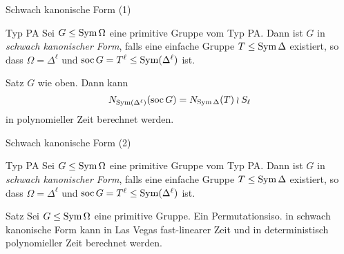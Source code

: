 
\begin{frame}{Schwach kanonische Form (1)}
\begin{block}{Typ PA}
Sei $G \leq \operatorname{Sym} \Omega$ eine primitive Gruppe vom Typ PA.
\pause
Dann ist $G$ in \emph{schwach kanonischer Form}, falls
eine einfache Gruppe
$T \leq \operatorname{Sym} \Delta$
existiert,
so dass
$\Omega = \Delta ^ \ell$ und
$\operatorname{soc} G = T ^ \ell \leq \operatorname{Sym}( \Delta ^ \ell)$ ist.
\end{block}

\pause
\begin{block}{Satz}
$G$ wie oben. Dann kann
\[
    N_{\operatorname{Sym} (\Delta ^ \ell)}(\operatorname{soc} G) =
    N_{\operatorname{Sym} \Delta}(T) \wr S_\ell
\]
in polynomieller Zeit berechnet werden.
\end{block}
\end{frame}

\begin{frame}{Schwach kanonische Form (2)}
\begin{block}{Typ PA}
Sei $G \leq \operatorname{Sym} \Omega$ eine primitive Gruppe vom Typ PA.
Dann ist $G$ in \emph{schwach kanonischer Form}, falls
eine einfache Gruppe
$T \leq \operatorname{Sym} \Delta$
existiert,
so dass
$\Omega = \Delta ^ \ell$ und
$\operatorname{soc} G = T ^ \ell \leq \operatorname{Sym}( \Delta ^ \ell)$ ist.
\end{block}

\pause
\begin{block}{Satz}
Sei $G \leq \operatorname{Sym} \Omega$ eine primitive Gruppe. Ein Permutationsiso. in schwach
kanonische Form kann in Las Vegas fast-linearer Zeit
und in deterministisch polynomieller Zeit
berechnet werden.
\end{block}
\vspace{2em}
\end{frame}


